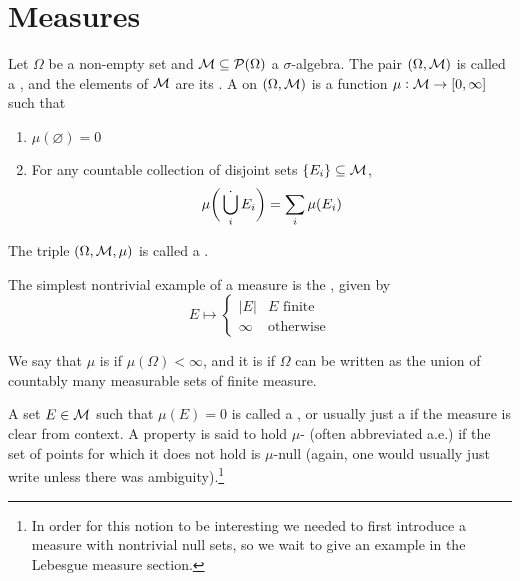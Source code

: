 \documentclass{article}
\begin{document}

\section{Measures}
Let $\Omega$ be a non-empty set and $\mathcal{M} \subseteq \mathcal{P}(\Omega)$ a $\sigma$-algebra.
The pair $(\Omega, \mathcal{M})$ is called a , and the elements of $\mathcal{M}$ are its .
A  on $(\Omega, \mathcal{M})$ is a function $\mu : \mathcal{M} \to [0,\infty]$ such that
\begin{enumerate}
\item $\mu(\varnothing) = 0$
\item For any countable collection of disjoint sets $\{E_i\} \subseteq \mathcal{M}$,
\[\mu\bigg(\mathop{\dot{\bigcup}}_i E_i\bigg) = \sum_i \mu(E_i)\]
\end{enumerate}
The triple $(\Omega, \mathcal{M}, \mu)$ is called a .

The simplest nontrivial example of a measure is the , given by
\[E \mapsto \begin{cases}
|E| & \text{$E$ finite} \\
\infty & \text{otherwise}
\end{cases}\]

We say that $\mu$ is  if $\mu(\Omega) < \infty$, and it is  if $\Omega$ can be written as the union of countably many measurable sets of finite measure.

A set $E \in \mathcal{M}$ such that $\mu(E) = 0$ is called a , or usually just a  if the measure is clear from context.
A property is said to hold $\mu$- (often abbreviated a.e.) if the set of points for which it does not hold is $\mu$-null (again, one would usually just write  unless there was ambiguity).\footnote{
    In order for this notion to be interesting we needed to first introduce a measure with nontrivial null sets, so we wait to give an example in the Lebesgue measure section.
}
\end{document}

